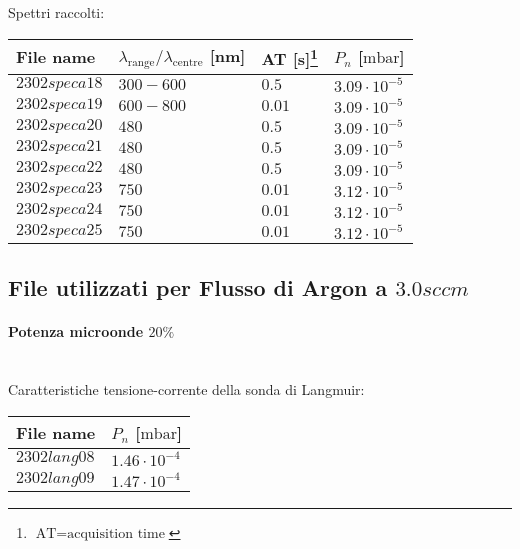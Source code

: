 Spettri raccolti:
\begin{center}
\begin{tabular}{p{3cm}p{4cm}p{2cm}p{3cm}}
\toprule
File name	&$\lambda_\text{range}\text{/}\lambda_\text{centre}$ [nm] 	&AT [s]\footnote{$\text{AT}=\text{acquisition time}$} &$P_n$ [$\si{\milli\bar}$]\\
\midrule
$2302speca18$	&$300-600$	&$0.5$		&$3.09\cdot10^{-5}$\\
$2302speca19$	&$600-800$	&$0.01$		&$3.09\cdot10^{-5}$\\
$2302speca20$	&$480$		&$0.5$		&$3.09\cdot10^{-5}$\\
$2302speca21$	&$480$		&$0.5$		&$3.09\cdot10^{-5}$\\
$2302speca22$	&$480$		&$0.5$		&$3.09\cdot10^{-5}$\\
$2302speca23$	&$750$		&$0.01$		&$3.12\cdot10^{-5}$\\
$2302speca24$	&$750$		&$0.01$		&$3.12\cdot10^{-5}$\\
$2302speca25$	&$750$		&$0.01$		&$3.12\cdot10^{-5}$\\
\bottomrule
\end{tabular}
\end{center}



\subsection{File utilizzati per Flusso di Argon a $3.0sccm$}

\paragraph*{Potenza microonde $\text{20\%}$} ~\\
Caratteristiche tensione-corrente della sonda di Langmuir:
\begin{center}
\begin{tabular}{p{3cm}p{3cm}}
\toprule
File name	&$P_{n}$ [$\si{\milli\bar}$]\\
\midrule
$2302lang08$	&$1.46\cdot10^{-4}$\\
$2302lang09$	&$1.47\cdot10^{-4}$\\
\bottomrule
\end{tabular}
\end{center}

